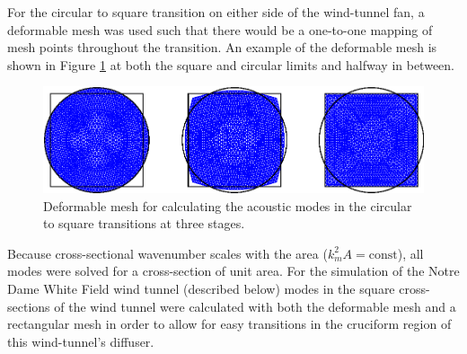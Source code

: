 For the circular to square transition on either side of the wind-tunnel fan, a deformable mesh was used such that there would be a one-to-one mapping of mesh points throughout the transition.
An example of the deformable mesh is shown in Figure \ref{fig:deformable_mesh} at both the square and circular limits and halfway in between.
\begin{figure}
  \centering
  \includegraphics{../matlab/03_aero_optics_acoustics/deformable_mesh.eps}
  \caption{Deformable mesh for calculating the acoustic modes in the circular to square transitions at three stages.}
  \label{fig:deformable_mesh}
\end{figure}
Because cross-sectional wavenumber scales with the area ($k_m^2A=\textrm{const}$), all modes were solved for a cross-section of unit area.
For the simulation of the Notre Dame White Field wind tunnel (described below) modes in the square cross-sections of the wind tunnel were calculated with both the deformable mesh and a rectangular mesh in order to allow for easy transitions in the cruciform region of this wind-tunnel's diffuser.

